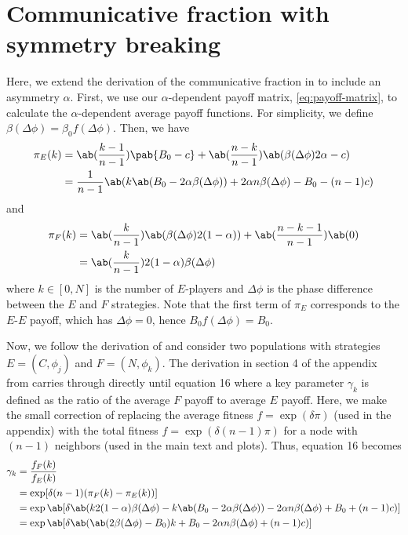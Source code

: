\section{Communicative fraction with symmetry breaking}
Here, we extend the derivation of the communicative fraction
in \tripp{} to include an asymmetry $\alpha$.
First, we use our $\alpha$-dependent payoff matrix, \cref{eq:payoff-matrix},
to calculate the $\alpha$-dependent average payoff functions.
For simplicity, we define $\beta(\Delta \phi) = \beta_0 f(\Delta \phi)$.
Then, we have
\begin{align}
  \pi_E(k) &= \ab(\frac{k-1}{n-1}) \pab{B_0 - c}
                + \ab(\frac{n-k}{n-1}) \ab(\beta(\Delta\phi) 2\alpha - c) \\
           &= \frac{1}{n-1}
               \ab(k \ab(B_0 - 2 \alpha \beta(\Delta\phi))
                 + 2 \alpha n \beta(\Delta\phi) - B_0 - (n-1) c)
\end{align}
and
\begin{align}
  \pi_F(k) &= \ab(\frac{k}{n-1}) \ab(\beta(\Delta\phi) 2 (1-\alpha))
                + \ab(\frac{n-k-1}{n-1}) \ab(0) \\
           &= \ab(\frac{k}{n-1}) 2 (1-\alpha) \beta(\Delta\phi)
\end{align}
where $k \in [0,N]$ is the number of $E$-players
and $\Delta \phi$ is the phase difference between the $E$ and $F$
strategies.
Note that the first term of $\pi_E$ corresponds
to the $E$-$E$ payoff, which has $\Delta \phi = 0$,
hence $B_0 f(\Delta \phi) = B_0$.

Now, we follow the derivation of \tripp{}
and consider two populations with strategies
$E=(C,\phi_j)$ and $F=(N,\phi_k)$.
The derivation in section 4 of the appendix
from \tripp{}
carries through directly until equation 16
where a key parameter $\gamma_k$ is defined
as the ratio of the average $F$ payoff to average $E$ payoff.
Here, we make the small correction of replacing
the average fitness $f = \exp(\delta \pi)$ (used in the appendix)
with the total fitness $f = \exp(\delta (n-1) \pi)$
for a node with $(n-1)$ neighbors
(used in the main text and plots).
Thus, equation 16 becomes
\begin{align*}
  \gamma_k &= \frac{f_F(k)}{f_E(k)} \\
           &= \exp[\delta (n-1) (\pi_F(k) - \pi_E(k))]
           \\
           &= \exp\ab[\delta \ab(
    k 2 (1-\alpha) \beta(\Delta\phi)
    - k \ab(B_0 - 2 \alpha \beta(\Delta\phi))
                 - 2 \alpha n \beta(\Delta\phi) + B_0 + (n-1) c)] \\
      &= \exp\ab[\delta \ab(
    \ab(2 \beta(\Delta\phi) - B_0) k
                 + B_0 - 2 \alpha n \beta(\Delta\phi) + (n-1) c)]
\end{align*}

